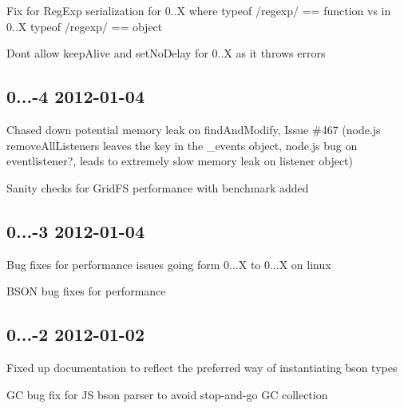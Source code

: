 \begin{DoxyItemize}
\item Fix for Reg\+Exp serialization for 0..\+X where typeof /regexp/ == \textquotesingle{}function\textquotesingle{} vs in 0..\+X typeof /regexp/ == \textquotesingle{}object\textquotesingle{}
\item Don\textquotesingle{}t allow keep\+Alive and set\+No\+Delay for 0..\+X as it throws errors
\end{DoxyItemize}

\subsection*{0...-\/4 2012-\/01-\/04 }


\begin{DoxyItemize}
\item Chased down potential memory leak on find\+And\+Modify, Issue \#467 (node.\+js remove\+All\+Listeners leaves the key in the \+\_\+events object, node.\+js bug on eventlistener?, leads to extremely slow memory leak on listener object)
\item Sanity checks for Grid\+FS performance with benchmark added
\end{DoxyItemize}

\subsection*{0...-\/3 2012-\/01-\/04 }


\begin{DoxyItemize}
\item Bug fixes for performance issues going form 0...\+X to 0...\+X on linux
\item B\+S\+ON bug fixes for performance
\end{DoxyItemize}

\subsection*{0...-\/2 2012-\/01-\/02 }


\begin{DoxyItemize}
\item Fixed up documentation to reflect the preferred way of instantiating bson types
\item GC bug fix for JS bson parser to avoid stop-\/and-\/go GC collection
\end{DoxyItemize}

